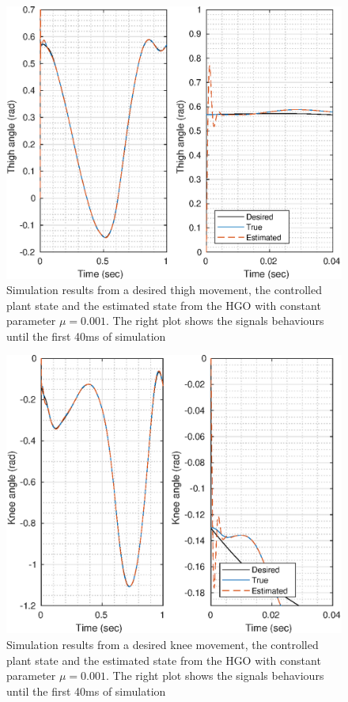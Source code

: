 \documentclass[letterpaper, 10 pt, journal, twocolumn]{IEEEtran}  %
\theoremstyle{plain}
\theoremstyle{definition}
\theoremstyle{remark}
\begin{document}
\begin{figure}[h!]
	\begin{center}
	\includegraphics[width = \columnwidth]{Figs/q_thigh_mu_1e-03.eps}
	\caption{ Simulation results from a desired thigh movement, the controlled plant state and the estimated state from the HGO with constant parameter $\mu=0.001$. The right plot shows the signals behaviours until the first 40ms of simulation}
	\label{fig:thigh}
	\end{center}
\end{figure}
%
%
\begin{figure}[h!]
	\begin{center}
	\includegraphics[width = \columnwidth]{Figs/q_knee_mu_1e-03.eps}
	\caption{ Simulation results from a desired knee movement, the controlled plant state and the estimated state from the HGO with constant parameter $\mu=0.001$. The right plot shows the signals behaviours until the first 40ms of simulation}
	\label{fig:knee}
	\end{center}
\end{figure}
\end{document}
